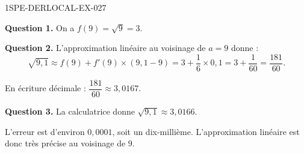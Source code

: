 \begin{corrige}{1SPE-DERLOCAL-EX-027}

\textbf{Question 1.} On a $f(9) = \sqrt{9} = 3$.

\textbf{Question 2.} L'approximation linéaire au voisinage de $a = 9$ donne :
\[
\sqrt{9{,}1} \approx f(9) + f'(9) \times (9{,}1 - 9) = 3 + \dfrac{1}{6} \times 0{,}1 = 3 + \dfrac{1}{60} = \boxed{\dfrac{181}{60}}.
\]

En écriture décimale : $\dfrac{181}{60} \approx 3{,}0167$.

\textbf{Question 3.} La calculatrice donne $\sqrt{9{,}1} \approx 3{,}0166$.

L'erreur est d'environ $0{,}0001$, soit un dix-millième. L'approximation linéaire est donc très précise au voisinage de $9$.

\end{corrige}
